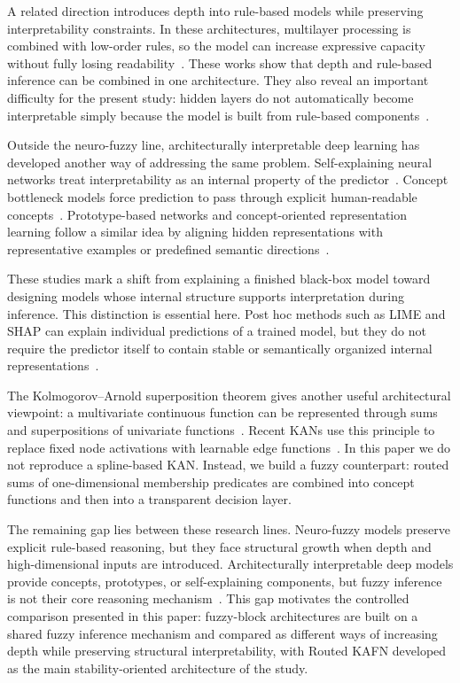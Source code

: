 \documentclass[runningheads]{llncs}
\begin{document}
A related direction introduces depth into rule-based models while preserving interpretability constraints. In these architectures, multilayer processing is combined with low-order rules, so the model can increase expressive capacity without fully losing readability~\cite{zeng2019deep,feng2020highly}. These works show that depth and rule-based inference can be combined in one architecture. They also reveal an important difficulty for the present study: hidden layers do not automatically become interpretable simply because the model is built from rule-based components~\cite{feng2020highly}.

Outside the neuro-fuzzy line, architecturally interpretable deep learning has developed another way of addressing the same problem. Self-explaining neural networks treat interpretability as an internal property of the predictor~\cite{alvarez2018self}. Concept bottleneck models force prediction to pass through explicit human-readable concepts~\cite{koh2020concept}. Prototype-based networks and concept-oriented representation learning follow a similar idea by aligning hidden representations with representative examples or predefined semantic directions~\cite{chen2019looks,chen2020concept}.

These studies mark a shift from explaining a finished black-box model toward designing models whose internal structure supports interpretation during inference. This distinction is essential here. Post hoc methods such as LIME and SHAP can explain individual predictions of a trained model, but they do not require the predictor itself to contain stable or semantically organized internal representations~\cite{ribeiro2016lime,lundberg2017shap,rudin2019stop}.

The Kolmogorov--Arnold superposition theorem gives another useful architectural viewpoint: a multivariate continuous function can be represented through sums and superpositions of univariate functions~\cite{kolmogorov1957superposition,arnold1957functions}. Recent KANs use this principle to replace fixed node activations with learnable edge functions~\cite{liu2024kan}. In this paper we do not reproduce a spline-based KAN. Instead, we build a fuzzy counterpart: routed sums of one-dimensional membership predicates are combined into concept functions and then into a transparent decision layer.

The remaining gap lies between these research lines. Neuro-fuzzy models preserve explicit rule-based reasoning, but they face structural growth when depth and high-dimensional inputs are introduced. Architecturally interpretable deep models provide concepts, prototypes, or self-explaining components, but fuzzy inference is not their core reasoning mechanism~\cite{zeng2019deep,alvarez2018self,koh2020concept,chen2019looks,chen2020concept}. This gap motivates the controlled comparison presented in this paper: fuzzy-block architectures are built on a shared fuzzy inference mechanism and compared as different ways of increasing depth while preserving structural interpretability, with Routed KAFN developed as the main stability-oriented architecture of the study.
\end{document}
